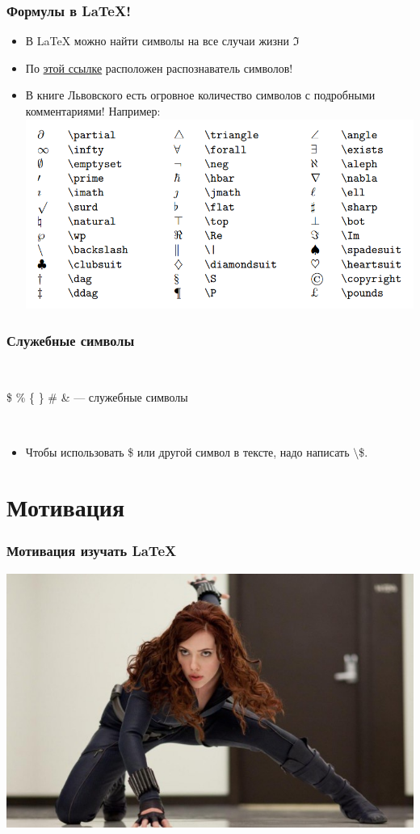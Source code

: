 \documentclass[newPxFont]{beamer}
\begin{document}
\begin{frame}
\frametitle{Формулы в \LaTeX!} 
\begin{itemize}
\item В \LaTeX{} можно найти символы на все случаи жизни $\Im$
\item По {\color{blue} \href{http://detexify.kirelabs.org/classify.html}{этой ссылке}} расположен распознаватель символов!
\item В книге Львовского есть огровное количество символов с подробными комментариями! Например: 
\centering  \includegraphics[scale=0.2]{table.png}
\end{itemize}
\end{frame}


\begin{frame}
\frametitle{Служебные символы} 

\mbox{ } 

\centering
\Large{ \$ \% \{ \} \# \& --- служебные символы}

\mbox{ }

\begin{itemize}
\item \normalsize{Чтобы использовать \$ или другой символ в тексте, надо написать $\setminus$\$.}
\end{itemize}
\end{frame}


\section{Мотивация}

\begin{frame}
\centering
\frametitle{Мотивация изучать \LaTeX{}} 
\includegraphics[scale=0.48]{scarlet.jpg}

\end{frame}
\end{document}
